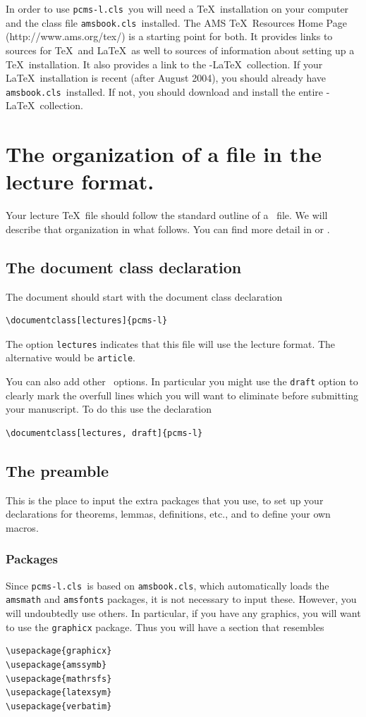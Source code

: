\documentclass[lectures, draft]{pcms-l}
\theoremstyle{plain}
\theoremstyle{definition}
\theoremstyle{remark}
\numberwithin{equation}{chapter}
\newcommand\pcms{\texttt{pcms-l.cls}}
\newcommand\amsbook{\texttt{amsbook.cls}}
\begin{document}
In order to use \pcms\ you will need a \TeX\ installation on your
computer and the class file \amsbook\ installed.  The AMS \TeX\ 
Resources Home Page (http://www.ams.org/tex/) is a starting point for
both.  It provides links to sources for \TeX\ and \LaTeX\ as well to
sources of information about setting up a \TeX\ installation.  It also
provides a link to the \AmS-\LaTeX\ collection.  If your \LaTeX\ 
installation is recent (after August 2004), you should already have
\amsbook\ installed.  If not, you should download and install the
entire \AmS-\LaTeX\ collection.


\section{The organization of a file in the lecture format.}

Your lecture \TeX\ file should follow the standard outline of a
\LaTeXe\ file.  We will describe that organization in what follows.
You can find more detail in \cite{gratz} or \cite{guide}.

\subsection{The document class declaration}

The document should start with the document class declaration
\begin{verbatim}
\documentclass[lectures]{pcms-l}
\end{verbatim}
The option \verb-lectures- indicates that this file will use the
lecture format.  The alternative would be \verb-article-.

You can also add other \LaTeXe\ options.  In particular you might use
the \verb-draft- option to clearly mark the overfull lines which you
will want to eliminate before submitting your manuscript.  To do this
use the declaration 
\begin{verbatim}
\documentclass[lectures, draft]{pcms-l}
\end{verbatim}

\subsection{The preamble}
This is the place to input the extra packages that you use, to set up
your declarations for theorems, lemmas, definitions, etc., and to 
define your own macros.
\subsubsection{Packages}  Since \pcms\ is based on \amsbook, which
automatically loads the \verb-amsmath- and \verb-amsfonts- packages,
it is not necessary to input these.  However, you will undoubtedly use
others.  In particular, if you have any graphics, you will want to use
the \verb-graphicx- package.  Thus you will have a section that
resembles 
\begin{verbatim}
\usepackage{graphicx}
\usepackage{amssymb}
\usepackage{mathrsfs}
\usepackage{latexsym}
\usepackage{verbatim}
\end{verbatim}
\end{document}

